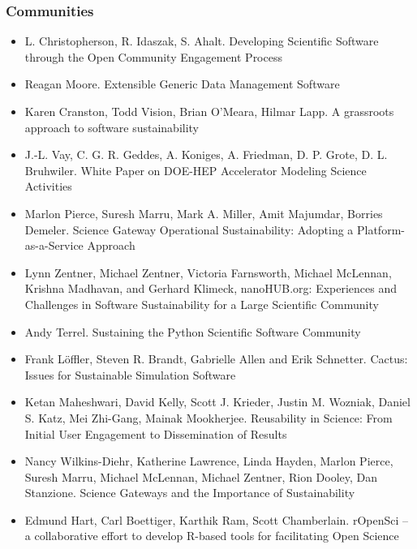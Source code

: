 \documentclass[11pt, oneside]{amsart}
\begin{document}
\subsubsection{Communities}

\begin{itemize}

\item L. Christopherson, R. Idaszak, S. Ahalt. Developing Scientific Software through the Open Community Engagement Process \cite{Christopherson_WSSSPE}

\item Reagan Moore. Extensible Generic Data Management Software \cite{Moore_WSSSPE}

\item Karen Cranston, Todd Vision, Brian O'Meara, Hilmar Lapp. A grassroots approach to software sustainability \cite{Cranston_WSSSPE}

\item J.-L. Vay, C. G. R. Geddes, A. Koniges, A. Friedman, D. P. Grote, D. L. Bruhwiler. White Paper on DOE-HEP Accelerator Modeling Science Activities \cite{Vay_WSSSPE}

\item Marlon Pierce, Suresh Marru, Mark A. Miller, Amit Majumdar, Borries Demeler. Science Gateway Operational Sustainability: Adopting a Platform-as-a-Service Approach \cite{Pierce2_WSSSPE}

\item Lynn Zentner, Michael Zentner, Victoria Farnsworth, Michael McLennan, Krishna Madhavan, and Gerhard Klimeck, nanoHUB.org: Experiences and Challenges in Software Sustainability for a Large Scientific Community \cite{Zentner_WSSSPE}

\item Andy Terrel. Sustaining the Python Scientific Software Community \cite{Terrel_WSSSPE}

\item Frank L\"{o}ffler, Steven R. Brandt, Gabrielle Allen and Erik Schnetter. Cactus: Issues for Sustainable Simulation Software \cite{Loffler_WSSSPE}

\item Ketan Maheshwari, David Kelly, Scott J. Krieder, Justin M. Wozniak, Daniel S. Katz, Mei Zhi-Gang, Mainak Mookherjee. Reusability in Science: From Initial User Engagement to Dissemination of Results \cite{Maheshwari_WSSSPE}

\item Nancy Wilkins-Diehr, Katherine Lawrence, Linda Hayden, Marlon Pierce, Suresh Marru, Michael McLennan, Michael Zentner, Rion Dooley, Dan Stanzione. Science Gateways and the Importance of Sustainability \cite{Wilkins-Diehr_WSSSPE}

\item Edmund Hart, Carl Boettiger, Karthik Ram, Scott Chamberlain. rOpenSci -- a collaborative effort to develop R-based tools for facilitating Open Science \cite{Hart_WSSSPE}

\end{itemize}
\end{document}
